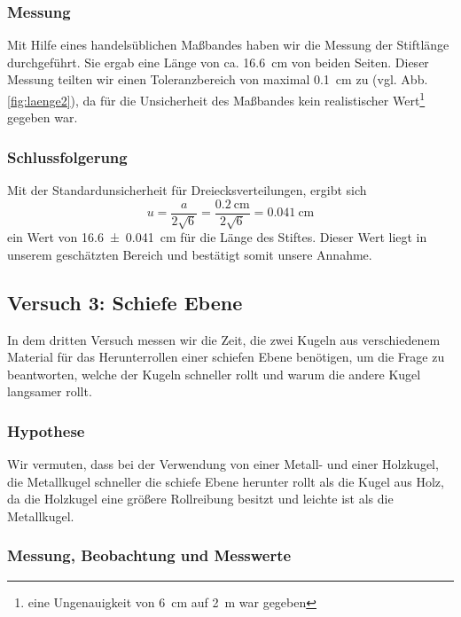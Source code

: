 \documentclass[11pt,a4paper,titlepage, ngerman]{article}
\begin{document}
			\subsubsection{Messung}
				\label{2.2.2}
				
				Mit Hilfe eines handelsüblichen Maßbandes haben wir die Messung der Stiftlänge durchgeführt. 
				Sie ergab eine Länge von ca. \SI{16,6}{\cm} von beiden Seiten. Dieser Messung teilten wir einen Toleranzbereich von maximal \SI{0,1}{\cm} zu (vgl. Abb. \ref{fig:laenge2}), da für die Unsicherheit des Maßbandes kein realistischer Wert\footnote{eine Ungenauigkeit von \SI{6}{\cm} auf \SI{2}{\m} war gegeben} gegeben war.
			
			\subsubsection{Schlussfolgerung}
				
				Mit der Standardunsicherheit für Dreiecksverteilungen, ergibt sich 
				\begin{equation*}
					u = \frac{a}{2 \sqrt{6}} = \frac{\SI{0,2}{\cm}}{2 \sqrt{6}} = \SI{0,041}{\cm}
				\end{equation*}
				ein Wert von \SI{16,6 \pm 0,041}{\cm} für die Länge des Stiftes. Dieser Wert liegt in unserem geschätzten Bereich und bestätigt somit unsere Annahme.
		\subsection{Versuch 3: Schiefe Ebene}
			\label{2.3}	
			
			In dem dritten Versuch messen wir die Zeit, die zwei Kugeln aus verschiedenem Material für das Herunterrollen einer schiefen Ebene benötigen, um die Frage zu beantworten, welche der Kugeln schneller rollt und warum die andere Kugel langsamer rollt.		
				
			\subsubsection{Hypothese}
				\label{2.3.1}
					
				Wir vermuten, dass bei der Verwendung von einer Metall- und einer Holzkugel, die Metallkugel schneller die schiefe Ebene herunter rollt als die Kugel aus Holz, da die Holzkugel eine größere Rollreibung besitzt und leichte ist als die Metallkugel. 
				
			\subsubsection{Messung, Beobachtung und Messwerte}
				\label{2.3.2}
				
\end{document}
